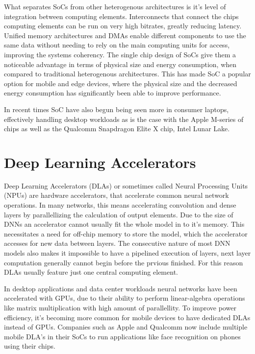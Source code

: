 \documentclass[12pt,a4paper,english
]{tunithesis}
\begin{document}
What separates SoCs from other heterogenous architectures is it's level of integration between computing elements. Interconnects that connect the chips computing elements can be run on very high bitrates, greatly reducing latency. Unified memory architectures and DMAs enable different components to use the same data without needing to rely on the main computing units for access, improving the systems coherency. The single chip design of SoCs give them a noticeable advantage in terms of physical size and energy consumption, when compared to traditional heterogenous architectures. This has made SoC a popular option for mobile and edge devices, where the physical size and the decreased energy consumption has significantly been able to improve performance.

In recent times SoC have also begun being seen more in consumer laptops, effectively handling desktop workloads as is the case with the Apple M-series of chips as well as the Qualcomm Snapdragon Elite X chip, Intel Lunar Lake.

\cite{di_natale_moving_2010}

\section{Deep Learning Accelerators}
\label{sec:dlas}
Deep Learning Accelerators (DLAs) or sometimes called Neural Processing Units (NPUs) are hardware accelerators, that accelerate common neural network operations. In many networks, this means accelerating convolution and dense layers by parallellizing the calculation of output elements. Due to the size of DNNs an accelerator cannot usually fit the whole model in to it's memory. This necessitates a need for off-chip memory to store the model, which the accelerator accesses for new data between layers. The consecutive nature of most DNN models also makes it impossible to have a pipelined execution of layers, next layer computation generally cannot begin before the prvious finished. For this reason DLAs usually feature just one central computing element.

In desktop applications and data center workloads neural networks have been accelerated with GPUs, due to their ability to perform linear-algebra operations like matrix multiplication with high amount of parallellity. To improve power efficiency, it's becoming more common for mobile devices to have dedicated DLAs instead of GPUs. Companies such as Apple and Qualcomm now include multiple mobile DLA's in their SoCs to run applications like face recognition on phones using their chips.
\end{document}
